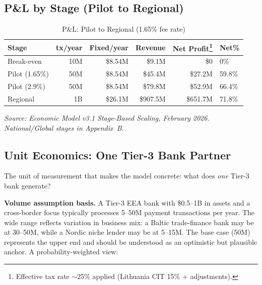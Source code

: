 \documentclass[11pt,a4paper]{article}
\newcommand{\tablesource}[1]{%
\par\vspace{3pt}%
{\footnotesize\color{gray!80}\textit{Source: #1}}%
\par\vspace{2pt}%
}
\begin{document}
\subsection*{P\&L by Stage (Pilot to Regional)}

\begin{table}[htbp]
\centering
\caption{P\&L: Pilot to Regional (1.65\% fee rate)}
\footnotesize
{}
\begin{tabularx}{\linewidth}{@{}lRRRRL@{}}
\toprule
\textbf{Stage} & \textbf{tx/year} & \textbf{Fixed/year} & \textbf{Revenue} & \textbf{Net Profit}\footnote{Effective tax rate $\sim$25\% applied (Lithuania CIT 15\% + adjustments).} & \textbf{Net\%} \\
\midrule
Break-even     & 10M  & \$8.54M  & \$9.1M   & \$0                            & 0\%   \\
Pilot (1.65\%) & 50M  & \$8.54M  & \$45.4M  & \textcolor{okgreen}{\$27.2M}   & \textcolor{okgreen}{59.8\%} \\
Pilot (2.9\%)  & 50M  & \$8.54M  & \$79.8M  & \textcolor{okgreen}{\$52.9M}   & \textcolor{okgreen}{66.4\%} \\
Regional       & 1B   & \$26.1M  & \$907.5M & \textcolor{okgreen}{\$651.7M}  & \textcolor{okgreen}{71.8\%} \\
\bottomrule
\end{tabularx}
\tablesource{Economic Model v3.1 Stage-Based Scaling, February 2026. National/Global stages in Appendix~B.}
\end{table}

\subsection*{Unit Economics: One Tier-3 Bank Partner}
\label{sec:financial_calibration}

The unit of measurement that makes the model concrete: what does \textit{one} Tier-3 bank generate?

\textbf{Volume assumption basis.} A Tier-3 EEA bank with \$0.5--1B in assets and a cross-border focus typically processes 5--50M payment transactions per year. The wide range reflects variation in business mix: a Baltic trade-finance bank may be at 30--50M, while a Nordic niche lender may be at 5--15M. The base case (50M) represents the upper end and should be understood as an optimistic but plausible anchor. A probability-weighted view:
\end{document}
